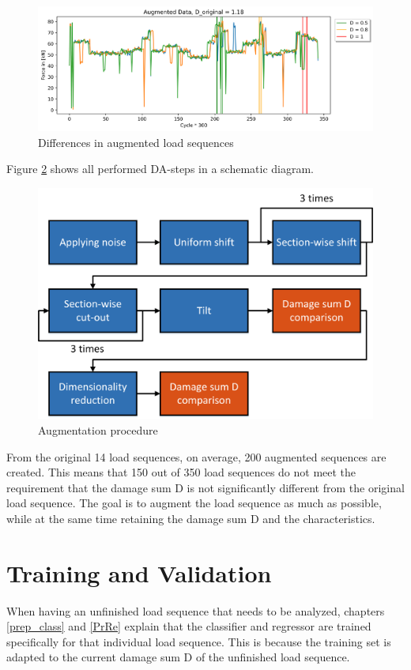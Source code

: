 \begin{figure}[H]
	\centering
	\includegraphics[width=1\linewidth]{IMGs/Augmented_5.png}
	\caption{Differences in augmented load sequences}
	\label{fig:3in1}
\end{figure}

\newpage
Figure \ref{fig:allDA} shows all performed DA-steps in a schematic diagram.

\begin{figure}[H]
	\centering
	\includegraphics[width=0.7\linewidth]{IMGs/Augmentation.png}
	\caption{Augmentation procedure}
	\label{fig:allDA}
\end{figure}

From the original 14 load sequences, on average, 200 augmented sequences are created. This means that 150 out of 350 load sequences do not meet the requirement that the damage sum D is not significantly different from the original load sequence. 
The goal is to augment the load sequence as much as possible, while at the same time retaining the damage sum D and the characteristics. 
\newpage

\section{Training and Validation}
When having an unfinished load sequence that needs to be analyzed, chapters \ref{prep_class} and \ref{PrRe} explain that the classifier and regressor are trained specifically for that individual load sequence. This is because the training set is adapted to the current damage sum D of the unfinished load sequence.

